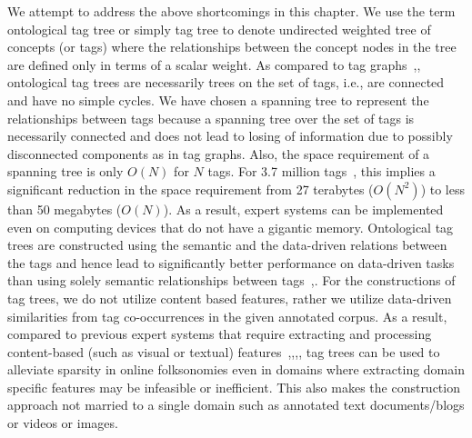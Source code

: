 We attempt to address the above shortcomings in this chapter. We use the term ontological tag tree or simply tag tree to denote undirected weighted tree of concepts (or tags) where the relationships between the concept nodes in the tree are defined only in terms of a scalar weight. 
As compared to tag graphs~\cite{sigurbjornsson2008flickr},\cite{liu2009tag}, ontological tag trees are necessarily trees on the set of tags, i.e., are connected and have no simple cycles. We have chosen a spanning tree to represent the relationships between tags because a spanning tree over the set of tags is necessarily connected and does not lead to losing of information due to possibly disconnected components as in tag graphs. Also, the space requirement of a spanning tree is only $O(N)$ for $N$ tags. For 3.7 million tags~\cite{sigurbjornsson2008flickr}, this implies a significant reduction in the space requirement from 27 terabytes ($O(N^2)$) to less than 50 megabytes ($O(N)$). As a result, expert systems can be implemented even on computing devices that do not have a gigantic memory. Ontological tag trees are constructed using the semantic and the data-driven relations between the tags and hence lead to significantly better performance on data-driven tasks than using solely semantic relationships between tags~\cite{MohdSemantic13},\cite{wordnet}. 
For the constructions of tag trees, we do not utilize content based features, rather we utilize data-driven similarities from tag co-occurrences in the given annotated corpus. As a result, compared to previous expert systems that require extracting and processing content-based (such as visual or textual) features~\cite{HsiehCollab09},\cite{ChenEstim15},\cite{SunLang11},\cite{ZhaoqiangRegulariz15}, tag trees can be used to alleviate sparsity in online folksonomies even in domains where extracting domain specific features may be infeasible or inefficient. This also makes the construction approach not married to a single domain such as annotated text documents/blogs or videos or images.


